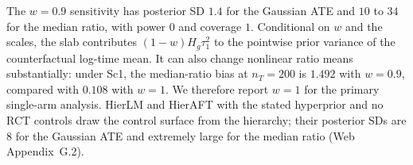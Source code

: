 The $w=0.9$ sensitivity has posterior SD $1.4$ for the Gaussian ATE and $10$ to $34$ for the median ratio, with power $0$ and coverage $1$. Conditional on $w$ and the scales, the slab contributes $(1-w)H_g\tau_1^2$ to the pointwise prior variance of the counterfactual log-time mean. It can also change nonlinear ratio means substantially: under Sc1, the median-ratio bias at $n_T=200$ is $1.492$ with $w=0.9$, compared with $0.108$ with $w=1$. We therefore report $w=1$ for the primary single-arm analysis. HierLM and HierAFT with the stated hyperprior and no RCT controls draw the control surface from the hierarchy; their posterior SDs are $8$ for the Gaussian ATE and extremely large for the median ratio (Web Appendix~G.2).


